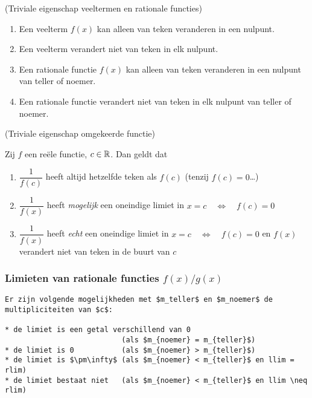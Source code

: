 \documentclass{ximera}
\begin{document}
\begin{proposition} (Triviale eigenschap veeltermen en rationale functies)
\begin{enumerate}
	\item Een veelterm $f(x)$ kan alleen van teken veranderen in een nulpunt. 
	\item Een veelterm verandert niet van teken in elk nulpunt.
	\item Een rationale functie $f(x)$ kan alleen van teken veranderen in een nulpunt van teller of noemer. 
	\item Een rationale functie  verandert niet van teken in elk nulpunt van teller of noemer.
\end{enumerate}
\end{proposition}

\begin{proposition} (Triviale eigenschap omgekeerde functie)
	
Zij $f$ een reële functie, $c\in\mathbb{R}$. Dan geldt dat
\begin{enumerate}
\item	$\dfrac{1}{f(c)}$ heeft altijd hetzelfde teken als $f(c)$  \quad(tenzij $f(c)=0$\dots)

\item    $\dfrac{1}{f(x)}$ heeft \textit{mogelijk} een oneindige limiet in $x=c \quad\iff\quad f(c)=0$ 

\item    $\dfrac{1}{f(x)}$ heeft \textit{echt} een oneindige limiet in $x=c \quad\iff\quad f(c)=0$ en $f(x)$ verandert niet van teken in de buurt van $c$ 
\end{enumerate}
\end{proposition}

\subsubsection{Limieten van rationale functies $f(x)/g(x)$}

\begin{verbatim}
Er zijn volgende mogelijkheden met $m_teller$ en $m_noemer$ de multipliciteiten van $c$:

* de limiet is een getal verschillend van 0  
                           (als $m_{noemer} = m_{teller}$)
* de limiet is 0           (als $m_{noemer} > m_{teller}$)
* de limiet is $\pm\infty$ (als $m_{noemer} < m_{teller}$ en llim = rlim)
* de limiet bestaat niet   (als $m_{noemer} < m_{teller}$ en llim \neq rlim)

\end{verbatim}
\end{document}
